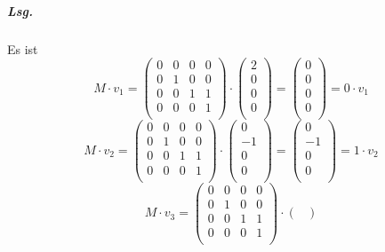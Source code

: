 \documentclass{scrreprt}
\begin{document}
\begin{enumerate}[(a)]
\begin{itemize}
    \subparagraph{Lsg.} Es ist
    \[
      M \cdot v_1 = \begin{pmatrix}
        0 & 0 & 0 & 0 \\
        0 & 1 & 0 & 0 \\
        0 & 0 & 1 & 1 \\
        0 & 0 & 0 & 1 \\
      \end{pmatrix} \cdot \begin{pmatrix}
        2 \\
        0 \\
        0 \\
        0 \\
      \end{pmatrix} = \begin{pmatrix}
        0 \\
        0 \\
        0 \\
        0 \\
      \end{pmatrix} = 0 \cdot v_1
    \]
    \[
      M \cdot v_2 = \begin{pmatrix}
        0 & 0 & 0 & 0 \\
        0 & 1 & 0 & 0 \\
        0 & 0 & 1 & 1 \\
        0 & 0 & 0 & 1 \\
      \end{pmatrix} \cdot \begin{pmatrix}
        0  \\
        -1 \\
        0  \\
        0  \\
      \end{pmatrix} = \begin{pmatrix}
        0  \\
        -1 \\
        0  \\
        0  \\
      \end{pmatrix} = 1 \cdot v_2
    \]
    \[
      M \cdot v_3 = \begin{pmatrix}
        0 & 0 & 0 & 0 \\
        0 & 1 & 0 & 0 \\
        0 & 0 & 1 & 1 \\
        0 & 0 & 0 & 1 \\
      \end{pmatrix} \cdot \begin{pmatrix}

\end{pmatrix}\]
\end{itemize}
\end{enumerate}
\end{document}
